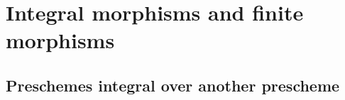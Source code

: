 \section{Integral morphisms and finite morphisms}
\label{section:2.6}


\subsection{Preschemes integral over another prescheme}
\label{subsection:2.6.1}












